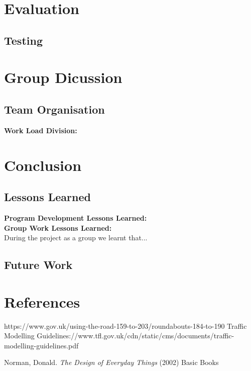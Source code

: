 \documentclass[11pt]{article}
\begin{document}
	\section{Evaluation} %
	\subsection{Testing} %
	\section{Group Dicussion}
	\subsection{Team Organisation} %
	\textbf{Work Load Division:}\\ 
	\section{Conclusion}
	\subsection{Lessons Learned} 
	\textbf{Program Development Lessons Learned:}\\ %
	
	\textbf{Group Work Lessons Learned:}\\ %
	During the project as a group we learnt that...%
	\subsection{Future Work} %
	\section{References}
	
	 https://www.gov.uk/using-the-road-159-to-203/roundabouts-184-to-190	
	Traffic Modelling Guidelines://www.tfl.gov.uk/cdn/static/cms/documents/traffic-modelling-guidelines.pdf
	
	\begin{thebibliography}{9}
			 Norman, Donald. \emph{The Design of Everyday Things} (2002) Basic Books
	\end{thebibliography}
	
\end{document}
